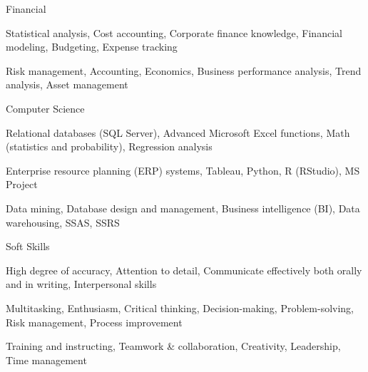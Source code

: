 \documentclass[11pt, a4paper]{awesome-cv}
\begin{document}
\begin{cvskills}

  \cvskill
    {Financial} %
    {
      \begin{cvitems}
        \item {Statistical analysis, Cost accounting, Corporate finance knowledge, Financial modeling, Budgeting, Expense tracking}
        \item {Risk management, Accounting, Economics, Business performance analysis, Trend analysis, Asset management}
      \end{cvitems}
    }

  \cvskill
    {Computer Science} %
    {
      \begin{cvitems} %
        \item {Relational databases (SQL Server), Advanced Microsoft Excel functions, Math (statistics and probability), Regression analysis}
        \item {Enterprise resource planning (ERP) systems, Tableau, Python, R (RStudio), MS Project}
        \item {Data mining, Database design and management, Business intelligence (BI), Data warehousing, SSAS, SSRS}
      \end{cvitems}
    }

  \cvskill
    {Soft Skills} %
    {
      \begin{cvitems} %
        \item {High degree of accuracy, Attention to detail, Communicate effectively both orally and in writing, Interpersonal skills}
        \item {Multitasking, Enthusiasm, Critical thinking, Decision-making, Problem-solving, Risk management, Process improvement}
        \item {Training and instructing, Teamwork \& collaboration, Creativity, Leadership, Time management}
      \end{cvitems}
    }

\end{cvskills}
\end{document}
